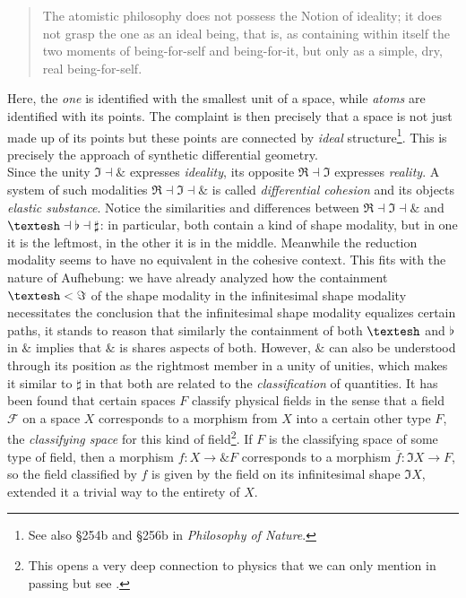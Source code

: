 \documentclass{article}
\begin{document}
\begin{quote}
    The atomistic philosophy does not possess the Notion of ideality; it does not grasp the one as an ideal being, that is, as containing within itself the two moments of being-for-self and being-for-it, but only as a simple, dry, real being-for-self.
\end{quote}

Here, the \emph{one} is identified with the smallest unit of a space, while \emph{atoms} are identified with
its points. The complaint is then precisely that a space is not just made up of its points but these points
are connected by \emph{ideal} structure\footnote{See also §254b and §256b in \emph{Philosophy of Nature}.}.
This is precisely the approach of synthetic differential geometry. \\

Since the unity $\Im\dashv\&$ expresses \emph{ideality}, its opposite $\Re\dashv\Im$ expresses
\emph{reality}. A system of such modalities $\Re\dashv\Im\dashv\&$ is called \emph{differential cohesion} and
its objects \emph{elastic substance}. Notice the similarities and differences between $\Re\dashv\Im\dashv\&$
and $\textrm{\textesh}\dashv\flat\dashv\sharp$: in particular, both contain a kind of shape modality, but in
one it is the leftmost, in the other it is in the middle. Meanwhile the reduction modality seems to have no
equivalent in the cohesive context. This fits with the nature of Aufhebung: we have already analyzed how the
containment $\textrm{\textesh}<\Im$ of the shape modality in the infinitesimal shape modality necessitates
the conclusion that the infinitesimal shape modality equalizes certain paths, it stands to reason that
similarly the containment of both $\textrm{\textesh}$ and $\flat$ in $\&$ implies that $\&$ is shares aspects
of both. However, $\&$ can also be understood through its position as the rightmost member in a unity of
unities, which makes it similar to $\sharp$ in that both are related to the \emph{classification} of
quantities. It has been found that certain spaces $F$ classify physical fields in the sense that a field
$\mathcal{F}$ on a space $X$ corresponds to a morphism from $X$ into a certain other type $F$, the
\emph{classifying space} for this kind of field\footnote{This opens a very deep connection to physics that we
can only mention in passing but see \cite{dcct}.}. If $F$ is the classifying space of some type of field,
then a morphism $f:X\rightarrow \& F$ corresponds to a morphism $\overline{f}:\Im X\rightarrow F$, so the
field classified by $f$ is given by the field on its infinitesimal shape $\Im X$, extended it a trivial way
to the entirety of $X$.   \\
\end{document}
